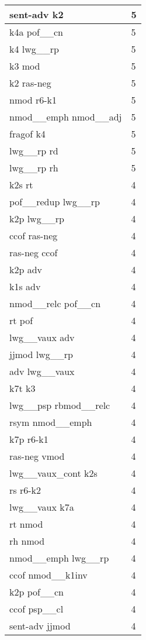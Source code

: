 \documentclass[a4 paper]{article}
\begin{document}
\begin{longtable}{p{}p{}}
sent-adv k2  & 5 \\ \midrule
k4a pof\_\_cn  & 5 \\ \midrule
k4 lwg\_\_rp  & 5 \\ \midrule
k3 mod  & 5 \\ \midrule
k2 ras-neg  & 5 \\ \midrule
nmod r6-k1  & 5 \\ \midrule
nmod\_\_emph nmod\_\_adj  & 5 \\ \midrule
fragof k4  & 5 \\ \midrule
lwg\_\_rp rd  & 5 \\ \midrule
lwg\_\_rp rh  & 5 \\ \midrule
k2s rt  & 4 \\ \midrule
pof\_\_redup lwg\_\_rp  & 4 \\ \midrule
k2p lwg\_\_rp  & 4 \\ \midrule
ccof ras-neg  & 4 \\ \midrule
ras-neg ccof  & 4 \\ \midrule
k2p adv  & 4 \\ \midrule
k1s adv  & 4 \\ \midrule
nmod\_\_relc pof\_\_cn  & 4 \\ \midrule
rt pof  & 4 \\ \midrule
lwg\_\_vaux adv  & 4 \\ \midrule
jjmod lwg\_\_rp  & 4 \\ \midrule
adv lwg\_\_vaux  & 4 \\ \midrule
k7t k3  & 4 \\ \midrule
lwg\_\_psp rbmod\_\_relc  & 4 \\ \midrule
rsym nmod\_\_emph  & 4 \\ \midrule
k7p r6-k1  & 4 \\ \midrule
ras-neg vmod  & 4 \\ \midrule
lwg\_\_vaux\_cont k2s  & 4 \\ \midrule
rs r6-k2  & 4 \\ \midrule
lwg\_\_vaux k7a  & 4 \\ \midrule
rt nmod  & 4 \\ \midrule
rh nmod  & 4 \\ \midrule
nmod\_\_emph lwg\_\_rp  & 4 \\ \midrule
ccof nmod\_\_k1inv  & 4 \\ \midrule
k2p pof\_\_cn  & 4 \\ \midrule
ccof psp\_\_cl  & 4 \\ \midrule
sent-adv jjmod  & 4 \\ \midrule

\end{longtable}
\end{document}
